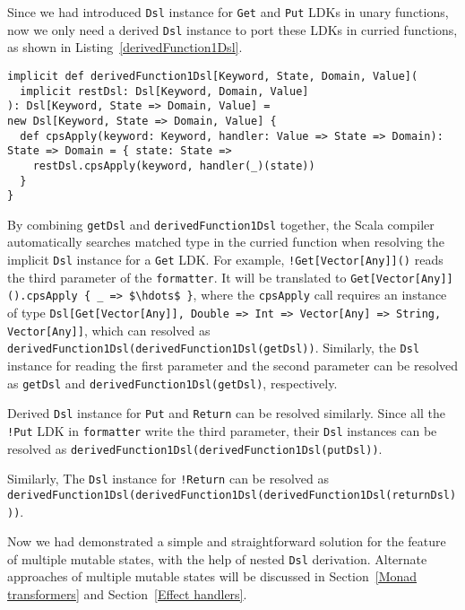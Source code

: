 Since we had introduced \lstinline{Dsl} instance for \lstinline{Get} and \lstinline{Put} LDKs in unary functions, now we only need a derived \lstinline{Dsl} instance to port these LDKs in curried functions, as shown in Listing~\ref{derivedFunction1Dsl}.

\begin{lstlisting}[caption={Derived \lstinline{Dsl} instance in a curried function},label={derivedFunction1Dsl}]
implicit def derivedFunction1Dsl[Keyword, State, Domain, Value](
  implicit restDsl: Dsl[Keyword, Domain, Value]
): Dsl[Keyword, State => Domain, Value] =
new Dsl[Keyword, State => Domain, Value] {
  def cpsApply(keyword: Keyword, handler: Value => State => Domain): State => Domain = { state: State =>
    restDsl.cpsApply(keyword, handler(_)(state))
  }
}
\end{lstlisting}

By combining \lstinline{getDsl} and \lstinline{derivedFunction1Dsl} together, the Scala compiler automatically searches matched type in the curried function when resolving the implicit \lstinline{Dsl} instance for a \lstinline{Get} LDK. For example, \lstinline{!Get[Vector[Any]]()} reads the third parameter of the \lstinline{formatter}. It will be translated to \lstinline[mathescape=true]|Get[Vector[Any]]().cpsApply { _ => $\hdots$ }|, where the \lstinline{cpsApply} call requires an instance of type \lstinline{Dsl[Get[Vector[Any]], Double => Int => Vector[Any] => String, Vector[Any]]}, which can resolved as \lstinline{derivedFunction1Dsl(derivedFunction1Dsl(getDsl))}. Similarly, the \lstinline{Dsl} instance for reading the first parameter and the second parameter can be resolved as \lstinline{getDsl} and \lstinline{derivedFunction1Dsl(getDsl)}, respectively.

Derived \lstinline{Dsl} instance for \lstinline{Put} and \lstinline{Return} can be resolved similarly. Since all the \lstinline{!Put} LDK in \lstinline{formatter} write the third parameter, their \lstinline{Dsl} instances can be resolved as \lstinline{derivedFunction1Dsl(derivedFunction1Dsl(putDsl))}.

Similarly, The \lstinline{Dsl} instance for \lstinline{!Return} can be resolved as \lstinline{derivedFunction1Dsl(derivedFunction1Dsl(derivedFunction1Dsl(returnDsl)))}.

Now we had demonstrated a simple and straightforward solution for the feature of multiple mutable states, with the help of nested \lstinline{Dsl} derivation. Alternate approaches of multiple mutable states will be discussed in Section~\ref{Monad transformers} and Section~\ref{Effect handlers}.


